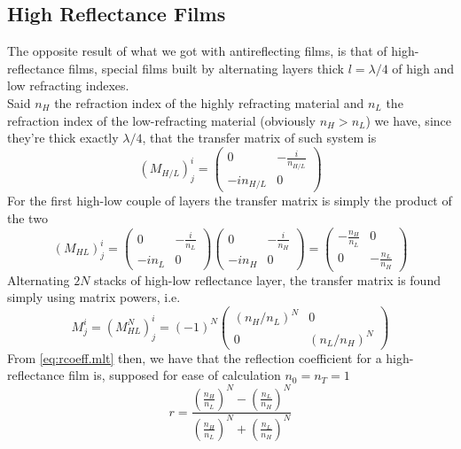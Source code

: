 \documentclass[../electromagnetism.tex]{subfiles}
\begin{document}
\subsection{High Reflectance Films}
The opposite result of what we got with antireflecting films, is that of high-reflectance films, special films built by alternating layers thick $l=\lambda/4$ of high and low refracting indexes.\\
Said $n_H$ the refraction index of the highly refracting material and $n_L$ the refraction index of the low-refracting material (obviously $n_H>n_L$) we have, since they're thick exactly $\lambda/4$, that the transfer matrix of such system is
\begin{equation}
	\left( M_{H/L} \right)^i_j=\begin{pmatrix}
		0&-\frac{i}{n_{H/L}}\\
		-in_{H/L}&0
	\end{pmatrix}
	\label{eq:hltransmatrix.hrf}
\end{equation}
For the first high-low couple of layers the transfer matrix is simply the product of the two
\begin{equation*}
	\left( M_{HL} \right)^i_j=\begin{pmatrix}
		0&-\frac{i}{n_L}\\
		-in_L&0
	\end{pmatrix}\begin{pmatrix}
		0&-\frac{i}{n_H}\\
		-in_H&0
	\end{pmatrix}=\begin{pmatrix}
		-\frac{n_H}{n_L}&0\\
		0&-\frac{n_L}{n_H}
	\end{pmatrix}
\end{equation*}
Alternating $2N$ stacks of high-low reflectance layer, the transfer matrix is found simply using matrix powers, i.e.
\begin{equation}
	M^i_j=\left( M_{HL}^N \right)^i_j=\left( -1 \right)^N\begin{pmatrix}
		\left( n_H/n_L \right)^N&0\\
		0&\left( n_L/n_H \right)^N
	\end{pmatrix}
	\label{eq:hrftrans.hrf}
\end{equation}
From \eqref{eq:rcoeff.mlt} then, we have that the reflection coefficient for a high-reflectance film is, supposed for ease of calculation $n_0=n_T=1$
\begin{equation}
	r=\frac{\left( \frac{n_H}{n_L} \right)^N-\left( \frac{n_L}{n_H} \right)^N}{\left( \frac{n_H}{n_L} \right)^N+\left( \frac{n_L}{n_H} \right)^N}
	\label{eq:rcoeff.hrf}
\end{equation}
\end{document}

